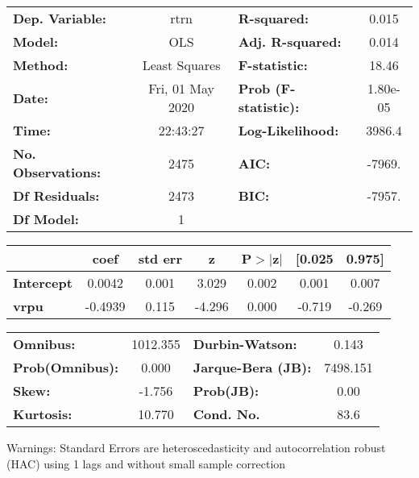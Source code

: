 \begin{center}
\begin{tabular}{lclc}
\toprule
\textbf{Dep. Variable:}    &       rtrn       & \textbf{  R-squared:         } &     0.015   \\
\textbf{Model:}            &       OLS        & \textbf{  Adj. R-squared:    } &     0.014   \\
\textbf{Method:}           &  Least Squares   & \textbf{  F-statistic:       } &     18.46   \\
\textbf{Date:}             & Fri, 01 May 2020 & \textbf{  Prob (F-statistic):} &  1.80e-05   \\
\textbf{Time:}             &     22:43:27     & \textbf{  Log-Likelihood:    } &    3986.4   \\
\textbf{No. Observations:} &        2475      & \textbf{  AIC:               } &    -7969.   \\
\textbf{Df Residuals:}     &        2473      & \textbf{  BIC:               } &    -7957.   \\
\textbf{Df Model:}         &           1      & \textbf{                     } &             \\
\bottomrule
\end{tabular}
\begin{tabular}{lcccccc}
                   & \textbf{coef} & \textbf{std err} & \textbf{z} & \textbf{P$> |$z$|$} & \textbf{[0.025} & \textbf{0.975]}  \\
\midrule
\textbf{Intercept} &       0.0042  &        0.001     &     3.029  &         0.002        &        0.001    &        0.007     \\
\textbf{vrpu}      &      -0.4939  &        0.115     &    -4.296  &         0.000        &       -0.719    &       -0.269     \\
\bottomrule
\end{tabular}
\begin{tabular}{lclc}
\textbf{Omnibus:}       & 1012.355 & \textbf{  Durbin-Watson:     } &    0.143  \\
\textbf{Prob(Omnibus):} &   0.000  & \textbf{  Jarque-Bera (JB):  } & 7498.151  \\
\textbf{Skew:}          &  -1.756  & \textbf{  Prob(JB):          } &     0.00  \\
\textbf{Kurtosis:}      &  10.770  & \textbf{  Cond. No.          } &     83.6  \\
\bottomrule
\end{tabular}
\end{center}

Warnings: \newline
 [1] Standard Errors are heteroscedasticity and autocorrelation robust (HAC) using 1 lags and without small sample correction